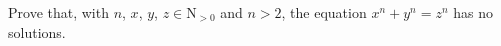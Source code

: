 



\usepackage{geometry}







\begin{exercise}
  Prove that, with $n$, $x$, $y$, $z\in\mathrm{N}_{>0}$ and $n>2$, the equation $x^n+y^n=z^n$ has no solutions.
\end{exercise}



